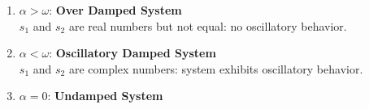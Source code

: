 \documentclass[a4paper,twoside]{report}
\begin{document}
{\begin{enumerate}
                \item
                    $\alpha > \omega$: \textbf{Over Damped System} \\
                    $s_1$ and $s_2$ are real numbers but not equal: no oscillatory behavior.

                \item
                    $\alpha < \omega$: \textbf{Oscillatory Damped System} \\
                    $s_1$ and $s_2$ are complex numbers: system exhibits oscillatory behavior.

                \item
                    $\alpha = 0$: \textbf{Undamped System}

            \end{enumerate}
        }
\end{document}
